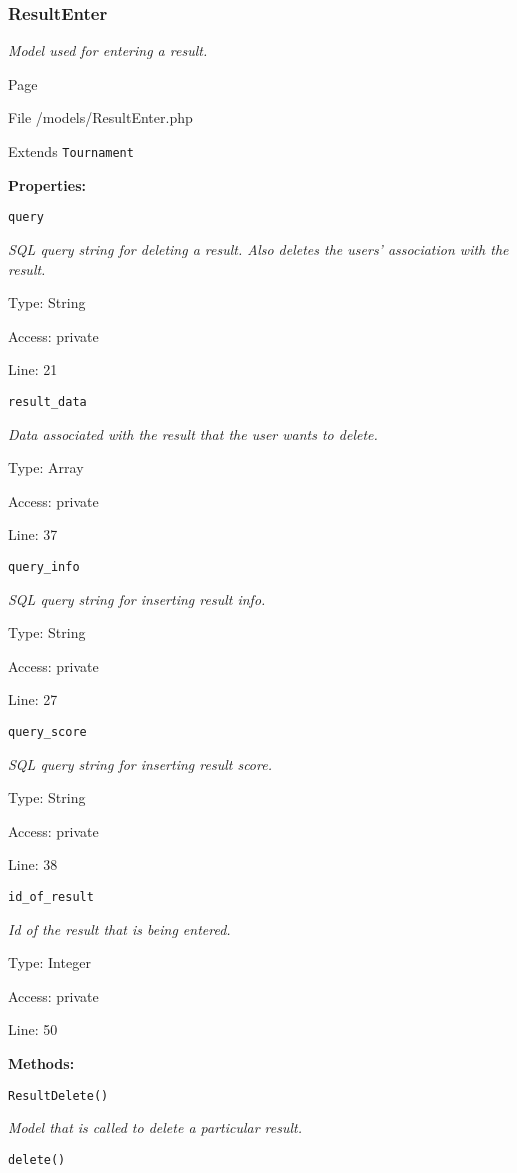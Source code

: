 \subsubsection{ResultEnter}
\textit{Model used for entering a result.}

Page \pageref{ResultEnter.php}

File /models/ResultEnter.php

Extends \texttt{Tournament}

\textbf{Properties:}

\texttt{query}

{\scriptsize
\textit{SQL query string for deleting a result.
Also deletes the users' association with the result.}

Type: String

Access: private

Line: 21

}
\texttt{result\_data}

{\scriptsize
\textit{Data associated with the result that the user wants to delete.}

Type: Array

Access: private

Line: 37

}
\texttt{query\_info}

{\scriptsize
\textit{SQL query string for inserting result info.}

Type: String

Access: private

Line: 27

}
\texttt{query\_score}

{\scriptsize
\textit{SQL query string for inserting result score.}

Type: String

Access: private

Line: 38

}
\texttt{id\_of\_result}

{\scriptsize
\textit{Id of the result that is being entered.}

Type: Integer

Access: private

Line: 50

}
\textbf{Methods:}

\texttt{ResultDelete()}

{\scriptsize
\textit{Model that is called to delete a particular result.}

}

\texttt{delete()}


